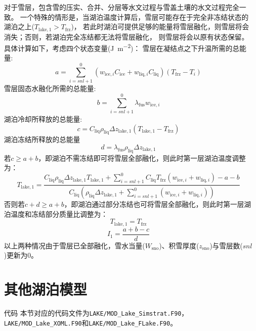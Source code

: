 对于雪层，包含雪的压实、合并、分层等水文过程与雪盖土壤的水文过程完全一致。
一个特殊的情形是，当湖泊温度计算后，雪层可能存在于完全非冻结状态的湖泊之上($T_{\mathrm{lake,1}}>T_{\mathrm {frz}} $)，
若此时湖泊可提供足够的能量将雪层融化，则雪层将会消失；否则，若湖泊完全冻结都无法将雪层融化，
则雪层将会以原有状态保留。具体计算如下，考虑四个状态变量(\unit{J.m^{-2}})：
雪层在凝结点之下升温所需的总能量:
\begin{equation}
  a=\sum_{i=s n l+1}^{0}\left(w_{\mathrm{ice},i} C_{\mathrm{ice}}+w_{\mathrm{liq},i} C_{\mathrm{liq}}\right)\left(T_{\mathrm {frz}}-T_{i}\right)
\end{equation}
雪层固态水融化所需的总能量:
\begin{equation}
  b=\sum_{i=s n l+1}^{0} \lambda_{\mathrm {fus}} w_{\mathrm{ice},i}
\end{equation}
湖泊冷却所释放的总能量:
\begin{equation}
  c=C_{\mathrm{liq}} \rho_{\mathrm{liq}} \Delta z_{\mathrm{lake, 1}}\left(T_{\mathrm{lake, 1}}-T_{\mathrm {frz}}\right)
\end{equation}
湖泊冻结所释放的总能量
\begin{equation}
  d=\lambda_{\mathrm {fus}} \rho_{\mathrm{liq}} \Delta z_{\mathrm{lake, 1}}
\end{equation}
若$c\geqslant a+b$，即湖泊不需冻结即可将雪层全部融化，则此时第一层湖泊温度调整为：
\begin{equation}
  T_{\mathrm{lake, 1}}=\frac{C_{\mathrm{liq}} \rho_{\mathrm{liq}} \Delta z_{\mathrm{lake, 1}} T_{\mathrm{lake, 1}}+\sum_{i=s n l+1}^{0} C_{\mathrm{liq}}
  T_{\mathrm {frz}}\left(w_{\mathrm{ice},i}+w_{\mathrm{liq},i}\right)-a-b}{C_{\mathrm{liq}}\left(\rho_{\mathrm{liq}} \Delta z_{\mathrm{lake, 1}}+\sum_{i=s n l+1}^{0}
  \left(w_{\mathrm{ice},i}+w_{\mathrm{liq},i}\right)\right)}
\end{equation}
否则若$c+d\geqslant a+b$，即湖泊通过部分冻结也可将雪层全部融化，则此时第一层湖泊温度和冻结部分质量比调整为：
\begin{equation}
  T_{\mathrm{lake, 1}}=T_{\mathrm {frz}}
\end{equation}
\begin{equation}
  I_{1}=\frac{a+b-c}{d}
\end{equation}
以上两种情况由于雪层已全部融化，雪水当量($W_{\mathrm{sno}}$)、积雪厚度($z_{\mathrm{sno}}$)与雪层数($snl$)更新为0。
%
\section{其他湖泊模型}\label{其他湖泊模型}
\begin{mymdframed}{代码}
  本节对应的代码文件为\texttt{LAKE/MOD\_Lake\_Simstrat.F90}，\texttt{LAKE/MOD\_Lake\_XOML.F90}和\texttt{LAKE/MOD\_Lake\_FLake.F90}。
\end{mymdframed}

